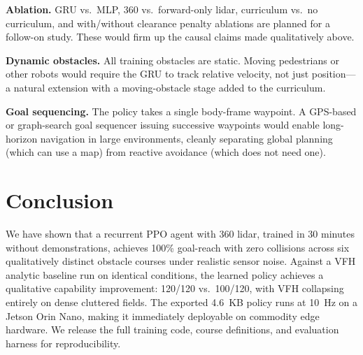 \documentclass[letterpaper, 10pt, journal]{IEEEtran}
\begin{document}
\textbf{Ablation.} GRU vs.\ MLP, 360\textdegree{} vs.\ forward-only lidar,
curriculum vs.\ no curriculum, and with/without clearance penalty ablations are
planned for a follow-on study. These would firm up the causal claims made qualitatively
above.

\textbf{Dynamic obstacles.} All training obstacles are static. Moving pedestrians or
other robots would require the GRU to track relative velocity, not just position---a
natural extension with a moving-obstacle stage added to the curriculum.

\textbf{Goal sequencing.} The policy takes a single body-frame waypoint. A GPS-based
or graph-search goal sequencer issuing successive waypoints would enable
long-horizon navigation in large environments, cleanly separating global planning
(which can use a map) from reactive avoidance (which does not need one).

\section{Conclusion}

We have shown that a recurrent PPO agent with 360\textdegree{} lidar, trained in
30 minutes without demonstrations, achieves 100\% goal-reach with zero collisions
across six qualitatively distinct obstacle courses under realistic sensor noise.
Against a VFH analytic baseline run on identical conditions, the learned policy
achieves a qualitative capability improvement: 120/120 vs.\ 100/120, with VFH
collapsing entirely on dense cluttered fields. The exported 4.6~KB policy runs at
10~Hz on a Jetson Orin Nano, making it immediately deployable on commodity edge
hardware. We release the full training code, course definitions, and evaluation
harness for reproducibility.
\end{document}
